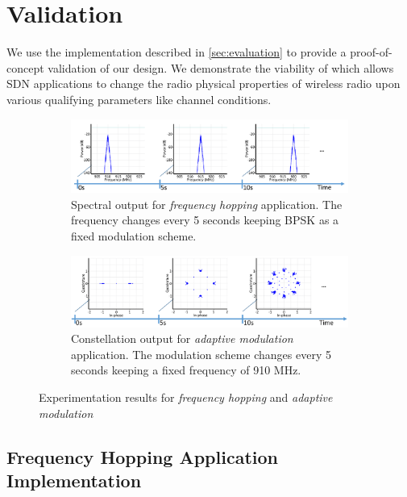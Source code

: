 \section{\crossflow Validation}


We use the \crossflow implementation described in \ref{sec:evaluation} to provide a proof-of-concept validation of our design. We demonstrate the viability of \crossflow which  allows SDN applications to change the radio physical properties of wireless radio upon various qualifying parameters like channel conditions. 


\begin{figure}
\centering
  \begin{subfigure}[b]{\textwidth}
        \centering
      \includegraphics[width=1\textwidth]{figures/Freq.pdf}
      \caption{Spectral output for \emph{frequency hopping} application. The frequency changes every 5 seconds keeping BPSK as a fixed modulation scheme.}
      \label{fig:freq}
  \end{subfigure}

  \begin{subfigure}[a]{\textwidth}
  \centering
      \includegraphics[width=1\textwidth]{figures/Mod.pdf}
      \caption{Constellation output for \emph{adaptive modulation} application. The modulation scheme changes every 5 seconds keeping a fixed frequency of 910 MHz.}
      \label{fig:mod}
  \end{subfigure}%
  \caption{Experimentation results for \emph{frequency hopping} and \emph{adaptive modulation}}
\end{figure}


\subsection{Frequency Hopping Application Implementation}

